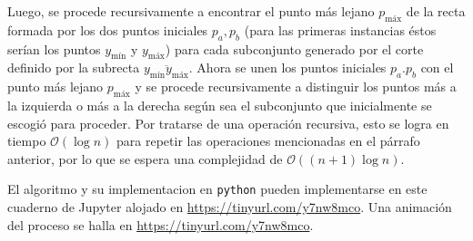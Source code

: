 \documentclass[paper=leter, fontsize=11pt]{scrartcl}
\numberwithin{equation}{section}		%
\numberwithin{figure}{section}			%
\numberwithin{table}{section}				%
\begin{document}
Luego, se procede recursivamente a encontrar el punto más lejano $p_{\text{máx}}$ de la recta formada por los dos puntos iniciales $p_a, p_b$ (para las primeras instancias éstos serían los puntos $y_{\text{mín}}$ y $y_{\text{máx}}$) para cada subconjunto generado por el corte definido por la subrecta $\overline{y_{\text{mín}} y_{\text{máx}}}$. Ahora se unen los puntos iniciales $p_a. p_b$ con el punto más lejano $p_{\text{máx}}$ y se procede recursivamente a distinguir los puntos más a la izquierda o más a la derecha según sea el subconjunto que inicialmente se escogió para proceder. Por tratarse de una operación recursiva, esto se logra en tiempo $\mathcal{O}(\log{n})$ para repetir las operaciones mencionadas en el párrafo anterior, por lo que se espera una complejidad de $\mathcal{O}((n + 1) \log{n})$.

El algoritmo y su implementacion en \texttt{python} pueden implementarse en este cuaderno de Jupyter alojado en \url{https://tinyurl.com/y7nw8mco}. Una animación del proceso se halla en \url{https://tinyurl.com/y7nw8mco}.



\end{document}
